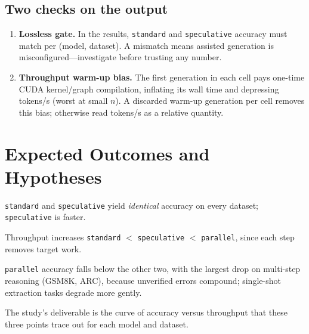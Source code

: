 \documentclass[11pt]{article}
\begin{document}
\subsection{Two checks on the output}
\begin{enumerate}[nosep]
  \item \textbf{Lossless gate.} In the results, \texttt{standard} and
        \texttt{speculative} accuracy must match per (model, dataset). A mismatch
        means assisted generation is misconfigured---investigate before trusting
        any number.
  \item \textbf{Throughput warm-up bias.} The first generation in each cell pays
        one-time CUDA kernel/graph compilation, inflating its wall time and
        depressing tokens/s (worst at small $n$). A discarded warm-up generation
        per cell removes this bias; otherwise read tokens/s as a relative
        quantity.
\end{enumerate}

\section{Expected Outcomes and Hypotheses}
\begin{description}[style=nextline,leftmargin=1.5em]
  \item[H1 (lossless verification).] \texttt{standard} and \texttt{speculative}
        yield \emph{identical} accuracy on every dataset; \texttt{speculative}
        is faster.
  \item[H2 (throughput ordering).] Throughput increases
        \texttt{standard} $<$ \texttt{speculative} $<$ \texttt{parallel}, since
        each step removes target work.
  \item[H3 (coherence collapse).] \texttt{parallel} accuracy falls below the
        other two, with the largest drop on multi-step reasoning (GSM8K, ARC),
        because unverified errors compound; single-shot extraction tasks degrade
        more gently.
\end{description}
The study's deliverable is the curve of accuracy versus throughput that these
three points trace out for each model and dataset.

\end{document}
